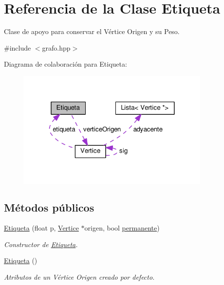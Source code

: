 \hypertarget{classEtiqueta}{}\section{Referencia de la Clase Etiqueta}
\label{classEtiqueta}


Clase de apoyo para conservar el Vértice Origen y su Peso.  




{\ttfamily \#include $<$grafo.\+hpp$>$}



Diagrama de colaboración para Etiqueta\+:\nopagebreak
\begin{figure}[H]
\begin{center}
\leavevmode
\includegraphics[width=272pt]{classEtiqueta__coll__graph}
\end{center}
\end{figure}
\subsection*{Métodos públicos}
\begin{DoxyCompactItemize}
\item 
\hyperlink{classEtiqueta_aa7f1cc55f5fed8f31cc176d375544349}{Etiqueta} (float p, \hyperlink{classVertice}{Vertice} $\ast$origen, bool \hyperlink{classEtiqueta_aa69958b23c24051acace2d464be55de4}{permanente})
\begin{DoxyCompactList}\small\item\em Constructor de \hyperlink{classEtiqueta}{Etiqueta}. \end{DoxyCompactList}\item 
\mbox{\label{classEtiqueta_aaf0b9fe57ea31a58b0dc4012cf8198a2}} 
\hyperlink{classEtiqueta_aaf0b9fe57ea31a58b0dc4012cf8198a2}{Etiqueta} ()
\begin{DoxyCompactList}\small\item\em Atributos de un Vértice Origen creado por defecto. \end{DoxyCompactList}\end{DoxyCompactItemize}
